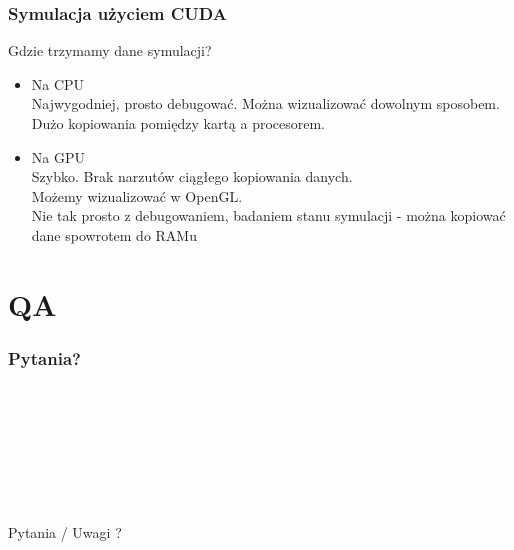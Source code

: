\documentclass[slidestop, compress, 10pt]{beamer}
\begin{document}
    \begin{frame}
        \frametitle{Symulacja użyciem CUDA}
        Gdzie trzymamy dane symulacji? \\
        \begin{itemize}
            \item<2-> Na CPU \\
                Najwygodniej, prosto debugować. Można wizualizować dowolnym sposobem. \\
                Dużo kopiowania pomiędzy kartą a procesorem.

            \item<3-> Na GPU \\
                Szybko. Brak narzutów ciągłego kopiowania danych. \\
                Możemy wizualizować w OpenGL. \\
                Nie tak prosto z debugowaniem, badaniem stanu symulacji - można kopiować dane spowrotem do RAMu
        \end{itemize}
    \end{frame}

\section{QA}
    \begin{frame}
        \frametitle{Pytania?}
        \centering
        ~ \\
        ~ \\
        ~ \\
        ~ \\
        ~ \\
        ~ \\
        ~ \\
        Pytania / Uwagi ?
    \end{frame}
\end{document}

